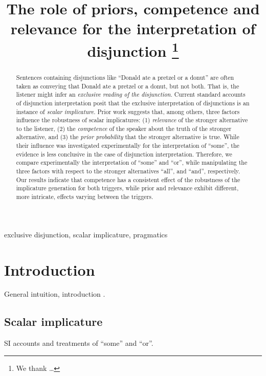 \documentclass{sp}
\title[Exclusive disjunction]{The role of priors, competence and relevance for the interpretation of disjunction%
  \thanks{We thank \ldots}}
\author[]{%
  \spauthor{Michael Franke \\ \institute{Institute1}} \AND
  \spauthor{Bob van Tiel \\ \institute{Institute2}} \AND
  \spauthor{Polina Tsvilodub \\ \institute{Institute3}}}
\begin{document}
\maketitle

\begin{abstract}
  
  Sentences containing disjunctions like ``Donald ate a pretzel or a donut'' are often taken as conveying that Donald ate a pretzel or a donut, but not both. That is, the listener might infer an \textit{exclusive reading of the disjunction}. Current standard accounts of disjunction interpretation posit that the exclusive interpretation of disjunctions is an instance of \textit{scalar implicature}. Prior work suggests that, among others, three factors influence the robustness of scalar implicatures: (1) \textit{relevance} of the stronger alternative to the listener, (2) the \textit{competence} of the speaker about the truth of the stronger alternative, and (3) the \textit{prior probability} that the stronger alternative is true. While their influence was investigated experimentally for the interpretation of ``some'', the evidence is less conclusive in the case of disjunction interpretation. Therefore, we compare experimentally the interpretation of ``some'' and ``or'', while manipulating the three factors with respect to the stronger alternatives “all”, and “and”, respectively. Our results indicate that competence has a consistent effect of the robustness of the implicature generation for both triggers, while prior and relevance exhibit different, more intricate, effects varying between the triggers.
  
\end{abstract}

\begin{keywords}
 exclusive disjunction, scalar implicature, pragmatics
\end{keywords}

\section{Introduction}

General intuition, introduction \citep[e.g.,][]{horn1972semantic}.

\subsection{Scalar implicature}

SI accounts and treatments of ``some'' and ``or''.
\end{document}
